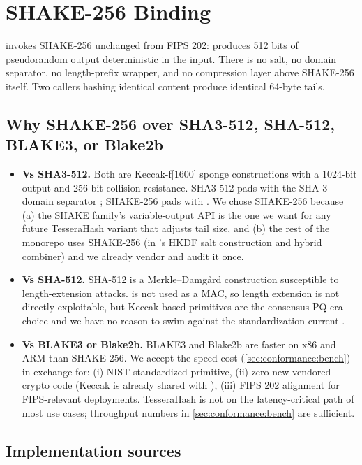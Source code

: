 \section{SHAKE-256 Binding}
\label{sec:shake256}

\tesserahash{} invokes SHAKE-256 \citep{fips202} unchanged from FIPS 202:  produces 512 bits of pseudorandom output deterministic in the input. There is no salt, no domain separator, no length-prefix wrapper, and no compression layer above SHAKE-256 itself. Two callers hashing identical content produce identical 64-byte tails.

\subsection{Why SHAKE-256 over SHA3-512, SHA-512, BLAKE3, or Blake2b}

\begin{itemize}
  \item \textbf{Vs SHA3-512.} Both are Keccak-f[1600] sponge constructions with a 1024-bit output and 256-bit collision resistance. SHA3-512 \citep{fips202} pads with the SHA-3 domain separator ; SHAKE-256 pads with . We chose SHAKE-256 because (a) the SHAKE family's variable-output API is the one we want for any future TesseraHash variant that adjusts tail size, and (b) the rest of the \tessera{} monorepo uses SHAKE-256 (in \tesseraseal{}'s HKDF salt construction and hybrid combiner) and we already vendor and audit it once.
  \item \textbf{Vs SHA-512.} SHA-512 is a Merkle--Damg{\aa}rd construction susceptible to length-extension attacks. \tesserahash{} is not used as a MAC, so length extension is not directly exploitable, but Keccak-based primitives are the consensus PQ-era choice and we have no reason to swim against the standardization current \citep{fips202}.
  \item \textbf{Vs BLAKE3 or Blake2b.} BLAKE3 and Blake2b are faster on x86 and ARM than SHAKE-256. We accept the speed cost (\cref{sec:conformance:bench}) in exchange for: (i) NIST-standardized primitive, (ii) zero new vendored crypto code (Keccak is already shared with \tesseraseal{}), (iii) FIPS 202 alignment for FIPS-relevant deployments. TesseraHash is not on the latency-critical path of most use cases; throughput numbers in \cref{sec:conformance:bench} are sufficient.
\end{itemize}

\subsection{Implementation sources}

